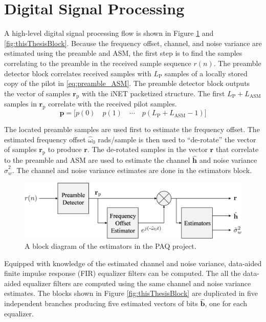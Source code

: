 \section{Digital Signal Processing}
\label{sec:signalProcessing}
A high-level digital signal processing flow is shown in Figure \ref{fig:estimators} and \ref{fig:thisThesisBlock}.
Because the frequency offset, channel, and noise variance are estimated using the preamble and ASM, the first step is to find the samples correlating to the preamble in the received sample sequence $r(n)$.
The preamble detector block correlates received samples with $L_\text{P}$ samples of a locally stored copy of the pilot in \eqref{eq:preamble_ASM}.
The preamble detector block outputs the vector of samples $\mathbf{r}_\text{p}$ with the iNET packetized structure.
The first $L_\text{P} + L_\text{ASM}$ samples in $\mathbf{r}_\text{p}$ correlate with the received pilot samples.
\begin{equation}
\mathbf{p} = \big[ p(0) \quad p(1) \quad \cdots  \quad  p(L_\text{P} + L_\text{ASM}-1) \big]
\label{eq:preamble_ASM}
\end{equation}

The located preamble samples are used first to estimate the frequency offset.
The estimated frequency offset $\hat{\omega}_0$ rads/sample is then used to ``de-rotate'' the vector of samples $\mathbf{r}_\text{p}$ to produce $\mathbf{r}$.
The de-rotated samples in the vector $\mathbf{r}$ that correlate to the preamble and ASM are used to estimate the channel $\hat{\mathbf{h}}$ and noise variance $\hat{\sigma}^2_w$.
The channel and noise variance estimates are done in the estimators block.
\begin{figure}
	\centering\includegraphics[width=8.75in/100*55]{figures/intro/estimators.pdf}
	\caption{A block diagram of the estimators in the PAQ project.}
	\label{fig:estimators}
\end{figure}

Equipped with knowledge of the estimated channel and noise variance, data-aided finite impulse response (FIR) equalizer filters can be computed.
The all the data-aided equalizer filters are computed using the same channel and noise variance estimates.
The blocks shown in Figure \ref{fig:thisThesisBlock} are duplicated in five independent branches producing five estimated vectors of bits $\hat{\mathbf{b}}$, one for each equalizer.

